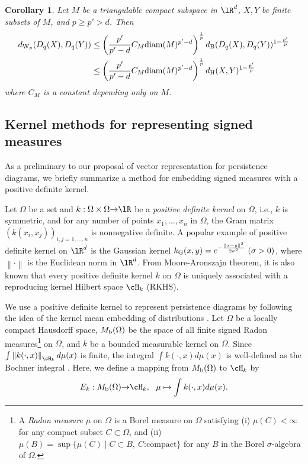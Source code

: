 \documentclass{article}
\newtheorem{cor}[thm]{Corollary}
\newcommand{\ra}{{\rightarrow}}
\newcommand{\diam}{{\rm diam}}
\providecommand{\norm}[1]{\left\lVert#1\right\rVert}
\providecommand{\pare}[1]{\left( #1 \right)}
\begin{document}
\begin{cor}
\label{cor:point_wasserstein}
Let $M$ be a triangulable compact subspace in $\lR^{d}$, $X,Y$ be finite subsets of $M$, and $p \geq p' > d$. Then 
\begin{align*}
d_{{\rm W}_{p}} (D_{q}(X), D_{q}(Y) )
&\leq  \pare{ \frac{p'}{p'-d}C_{M}\diam(M)^{p'-d} }^{\frac{1}{p}} d_{{\rm B}}(D_{q}(X),D_{q}(Y))^{1-\frac{p'}{p}} \\
&\leq  \pare{ \frac{p'}{p'-d}C_{M}\diam(M)^{p'-d} }^{\frac{1}{p}} d_{{\rm H}}(X,Y)^{1-\frac{p'}{p}}
\end{align*}
where $C_{M}$ is a constant depending only on $M$.
\end{cor}

\subsection{Kernel methods for representing signed measures}
\label{subsec:universal}

As a preliminary to our proposal of vector representation for persistence diagrams, we briefly summarize a method for embedding signed measures with a positive definite kernel.

Let $\Omega$ be a set and $k:\Omega \times \Omega \ra \lR$ be a {\em positive definite kernel} on $\Omega$, i.e., $k$ is symmetric, and for any number of points $x_{1},\ldots,x_{n}$ in $\Omega$, the Gram matrix $\pare{k(x_{i},x_{j})}_{i,j=1,\ldots,n}$ is nonnegative definite.
A popular example of positive definite kernel on $\lR^{d}$ is the Gaussian kernel $k_{{\rm G}}(x,y)=e^{-\frac{\norm{x-y}^{2}}{2 \sigma^{2}}} \ (\sigma>0)$, where $\norm{\cdot}$ is the Euclidean norm in $\lR^{d}$.
From Moore-Aronszajn theorem, it is also known that every positive definite kernel $k$ on $\Omega$ is uniquely associated with a reproducing kernel Hilbert space $\cH_{k}$ (RKHS).

We use a positive definite kernel to represent persistence diagrams by following the idea of the kernel mean embedding of distributions \cite{MFSS17, SGSS07,SFL11}.
Let $\Omega$ be a locally compact Hausdorff space, $M_{{\rm b}}(\Omega)$ be the space of all finite signed Radon measures\footnote{A {\em Radon measure} $\mu$ on $\Omega$ is a Borel measure on $\Omega$ satisfying
(i) $\mu(C) < \infty$ for any compact subset $C \subset \Omega$, and 
(ii) $\mu(B)=\sup \{ \mu(C) \mid C \subset B, ~ C \mbox{:compact}\}$ for any $B$ in the Borel $\sigma$-algebra of $\Omega$.} on $\Omega$, and $k$ be a bounded measurable kernel on $\Omega$.
Since $\int \norm{k(\cdot,x)}_{\cH_{k}} d \mu(x)$ is finite, the integral $\int k(\cdot, x) d \mu(x)$ is well-defined as the Bochner integral \cite{DU77}.
Here, we define a mapping from $M_{{\rm b}}(\Omega)$ to $\cH_{k}$ by
\begin{equation}\label{eq:E_k}
E_{k}:M_{{\rm b}}(\Omega) \ra \cH_{k}, ~~ \mu \mapsto \int k(\cdot, x) d \mu(x).
\end{equation}
\end{document}
